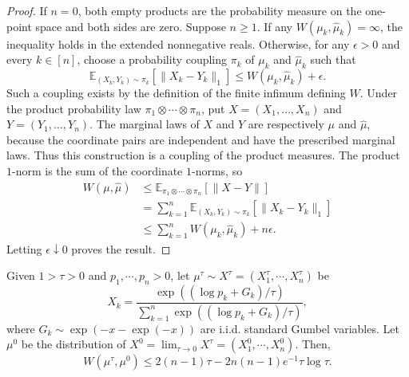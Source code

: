       \begin{proof}
If $n=0$, both empty products are the probability measure on the one-point space and both sides are zero. Suppose $n\geqslant1$. If any $W(\mu_k,\hat\mu_k)=\infty$, the inequality holds in the extended nonnegative reals. Otherwise, for any $\epsilon>0$ and every $k\in[n]$, choose a probability coupling $\pi_k$ of $\mu_k$ and $\hat\mu_k$ such that
\begin{equation*}
\mathbb E_{(X_k,Y_k)\sim\pi_k}[\|X_k-Y_k\|_1]\leqslant W(\mu_k,\hat\mu_k)+\epsilon.
\end{equation*}
Such a coupling exists by the definition of the finite infimum defining $W$. Under the product probability law $\pi_1\otimes\cdots\otimes\pi_n$, put $X=(X_1,\ldots,X_n)$ and $Y=(Y_1,\ldots,Y_n)$. The marginal laws of $X$ and $Y$ are respectively $\mu$ and $\hat\mu$, because the coordinate pairs are independent and have the prescribed marginal laws. Thus this construction is a coupling of the product measures. The product $1$-norm is the sum of the coordinate $1$-norms, so
\begin{align*}
W(\mu,\hat\mu)
&\leqslant\mathbb E_{\pi_1\otimes\cdots\otimes\pi_n}[\|X-Y\|]\\
&=\sum_{k=1}^n\mathbb E_{(X_k,Y_k)\sim\pi_k}[\|X_k-Y_k\|_1]\\
&\leqslant\sum_{k=1}^n W(\mu_k,\hat\mu_k)+n\epsilon.
\end{align*}
Letting $\epsilon\downarrow0$ proves the result.
      \end{proof}

    \begin{lemma}\label{lemma:gumbel_err}
        Given $1 >\tau  >0$ and $p_{1} ,\cdots ,p_{n}  >0$, let $\mu ^{\tau } \sim X^{\tau } =\left( X_{1}^{\tau } ,\cdots ,X_{n}^{\tau }\right)$ be 
\begin{equation}
X_{k} =\frac{\exp((\log p_{k} +G_{k}) /\tau )}{\sum _{k=1}^{n}\exp((\log p_{k} +G_{k}) /\tau )} ,\label{eq:gumbel}
\end{equation}
where $G_{k} \sim \exp( -x-\exp( -x))$ are i.i.d. standard Gumbel variables. Let $\mu ^{0}$ be the distribution of $X^{0} =\lim _{\tau \rightarrow 0} X^{\tau } =\left( X_{1}^{0} ,\cdots ,X_{n}^{0}\right)$. Then,  
\begin{equation*}
W\left( \mu ^{\tau } ,\mu ^{0}\right) \leqslant 2( n-1) \tau -2n( n-1) e^{-1} \tau \log \tau .
\end{equation*}
    \end{lemma}

